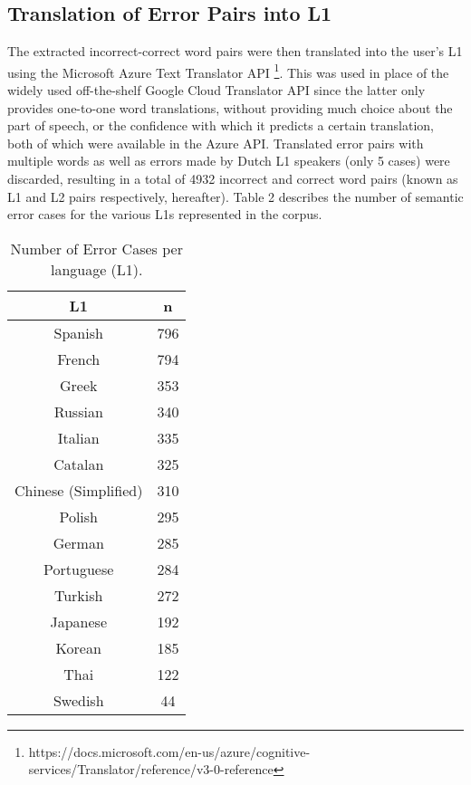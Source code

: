\documentclass[10pt,letterpaper]{article}
\begin{document}
\subsection{Translation of Error Pairs into L1}

The extracted incorrect-correct word pairs were then translated into the user's L1 using the Microsoft Azure Text Translator API \footnote{https://docs.microsoft.com/en-us/azure/cognitive-services/Translator/reference/v3-0-reference}. This was used in place of the widely used off-the-shelf Google Cloud Translator API since the latter only provides one-to-one word translations, without providing much choice about the part of speech, or the confidence with which it predicts a certain translation, both of which were available in the Azure API. Translated error pairs with multiple words as well as errors made by Dutch L1 speakers (only 5 cases) were discarded, resulting in a total of 4932 incorrect and correct word pairs (known as L1 and L2 pairs respectively, hereafter). Table 2 describes the number of semantic error cases for the various L1s represented in the corpus.

\begin{table}[H]

\caption{\label{tab:}Number of Error Cases per language (L1).}
\begin{center}
\begin{tabular}{|c|c|}
\hline
\toprule
\textbf{L1} & \textbf{n}\\
\hline
Spanish & 796\\
French & 794\\
Greek & 353\\
Russian & 340\\
Italian & 335\\
\addlinespace
Catalan & 325\\
Chinese (Simplified) & 310\\
Polish & 295\\
German & 285\\
Portuguese & 284\\
\addlinespace
Turkish & 272\\
Japanese & 192\\
Korean & 185\\
Thai & 122\\
Swedish & 44\\
\bottomrule
\hline
\end{tabular}
\end{center}
\end{table}
\end{document}
